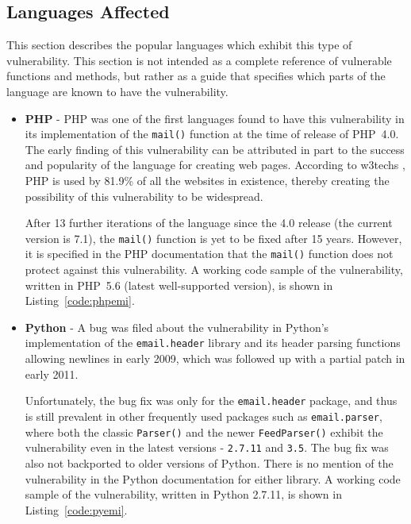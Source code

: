 \subsection{Languages Affected}
\label{languages}
This section describes the popular languages which exhibit this type of vulnerability. This section is not intended as a complete reference of vulnerable functions and methods, but rather as a guide that specifies which parts of the language are known to have the vulnerability.

\begin{itemize}
\item{\textbf{PHP}} - PHP was one of the first languages found to have this vulnerability in its implementation of the \texttt{mail()} function at the time of release of PHP~4.0. The early finding of this vulnerability can be attributed in part to the success and popularity of the language for creating web pages. According to w3techs \cite{W3techs}, PHP is used by 81.9\% of all the websites in existence, thereby creating the possibility of this vulnerability to be widespread.

After 13 further iterations of the language since the 4.0 release (the current version is 7.1), the \texttt{mail()} function is yet to be fixed after 15 years. However, it is specified in the PHP documentation \cite{PHPDocs} that the \texttt{mail()} function does not protect against this vulnerability.
A working code sample of the vulnerability, written in PHP~5.6 (latest well-supported version), is shown in  Listing~\ref{code:phpemi}.

\item{\textbf{Python}} -
A bug was filed about the vulnerability in Python's implementation of the \texttt{email.header} library and its header parsing functions allowing newlines in early 2009, which was followed up with a partial patch in early 2011.

Unfortunately, the bug fix was only for the \texttt{email.header} package, and thus is still prevalent in other frequently used packages such as \texttt{email.parser}, where both the classic \texttt{Parser()} and the newer \texttt{FeedParser()} exhibit the vulnerability even in the latest versions - \texttt{2.7.11} and \texttt{3.5}. The bug fix was also not backported to older versions of Python.
There is no mention of the vulnerability in the Python documentation for either library.
A working code sample of the vulnerability, written in Python 2.7.11, is shown in Listing~\ref{code:pyemi}.



\end{itemize}

